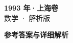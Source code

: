 \documentclass[zihao=-4, a4paper]{ctexart}
\begin{document}
\begin{center}
  {\Large\bfseries 1993 年·上海卷}\\[4pt]
  {\large 数学 · 解析版}
\end{center}
\medskip
{}

\clearpage
{}
\begin{center}{\Large\bfseries 参考答案与详细解析}\end{center}
\medskip

\end{document}
